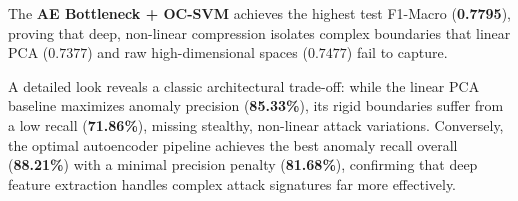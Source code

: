     \begin{table}[H]
        \centering
        \vspace{0.5em}
        \caption{Comprehensive comparison of anomaly detection methods across metrics.}
        \label{tab:method_comparison_f1}
    \end{table}

    \noindent
    The \textbf{AE Bottleneck + OC-SVM} achieves the highest test F1-Macro (\textbf{0.7795}), proving that deep, non-linear compression isolates complex boundaries that linear PCA ($0.7377$) and raw high-dimensional spaces ($0.7477$) fail to capture. 

    \noindent
    A detailed look reveals a classic architectural trade-off: while the linear PCA baseline maximizes anomaly precision (\textbf{85.33\%}), its rigid boundaries suffer from a low recall (\textbf{71.86\%}), missing stealthy, non-linear attack variations. 
    Conversely, the optimal autoencoder pipeline achieves the best anomaly recall overall (\textbf{88.21\%}) with a minimal precision penalty (\textbf{81.68\%}), confirming that deep feature extraction handles complex attack signatures far more effectively.
